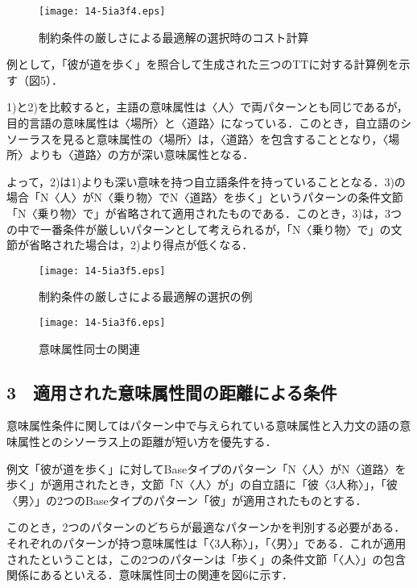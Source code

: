 \documentclass[japanese]{jnlp_1.4}
\begin{document}
\begin{figure}[t]
\begin{center}
\texttt{[image: 14-5ia3f4.eps]}
\end{center}
 \caption{制約条件の厳しさによる最適解の選択時のコスト計算}
\end{figure}

例として，「彼が道を歩く」を照合して生成された三つのTTに対する計算例を示す（図5）．

1)と2)を比較すると，主語の意味属性は〈人〉で両パターンとも同じであるが，目的言語の意味属性は〈場所〉と〈道路〉になっている．このとき，自立語のシソーラスを見ると意味属性の〈場所〉は，〈道路〉を包含することとなり，〈場所〉よりも〈道路〉の方が深い意味属性となる．

よって，2)は1)よりも深い意味を持つ自立語条件を持っていることとなる．3)の場合「N〈人〉がN〈乗り物〉でN〈道路〉を歩く」というパターンの条件文節「N〈乗り物〉で」が省略されて適用されたものである．このとき，3)は，3つの中で一番条件が厳しいパターンとして考えられるが，「N〈乗り物〉で」の文節が省略された場合は，2)より得点が低くなる．


\begin{figure}[p]
\begin{center}
\texttt{[image: 14-5ia3f5.eps]}
\end{center}
 \caption{制約条件の厳しさによる最適解の選択の例}
\vspace{2\baselineskip}
\begin{center}
\texttt{[image: 14-5ia3f6.eps]}
\end{center}
 \caption{意味属性同士の関連}
\end{figure}

\subsection*{3　適用された意味属性間の距離による条件}

意味属性条件に関してはパターン中で与えられている意味属性と入力文の語の意味属性とのシソーラス上の距離が短い方を優先する．

例文「彼が道を歩く」に対してBaseタイプのパターン「N〈人〉がN〈道路〉を歩く」が適用されたとき，文節「N〈人〉が」の自立語に「彼〈3人称〉」，「彼〈男〉」の2つのBaseタイプのパターン「彼」が適用されたものとする．

このとき，2つのパターンのどちらが最適なパターンかを判別する必要がある．それぞれのパターンが持つ意味属性は「〈3人称〉」，「〈男〉」である．これが適用されたということは，この2つのパターンは「歩く」の条件文節「〈人〉」の包含関係にあるといえる．意味属性同士の関連を図6に示す．
\end{document}
